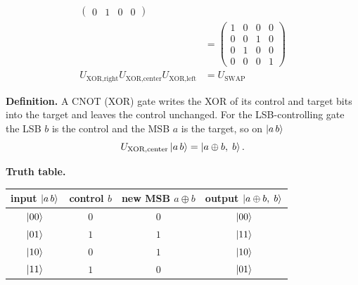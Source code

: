 \documentclass[a4paper, 10pt]{article}
\begin{document}
\begin{problem}
\begin{align*}
\begin{pmatrix}
		                   0 & 1 & 0 & 0
	                   \end{pmatrix}               \\
	 & = \begin{pmatrix}
		     1 & 0 & 0 & 0 \\
		     0 & 0 & 1 & 0 \\
		     0 & 1 & 0 & 0 \\
		     0 & 0 & 0 & 1
	     \end{pmatrix}                             \\
	U_{\text{XOR}, \text{right}} U_{\text{XOR}, \text{center}} U_{\text{XOR}, \text{left}}
	 & = U_{\text{SWAP}}
\end{align*}
\end{problem}

\begin{solution}
	\noindent \textbf{Definition.} A CNOT (XOR) gate writes the XOR of its control and target bits into the target and leaves the control unchanged.
	For the LSB-controlling gate the LSB \( b \) is the control and the MSB \( a \) is the target, so on \( \ket{a\,b} \)
	\[
		U_{\text{XOR},\text{center}}\ket{a\,b} = \ket{a \oplus b,\; b}.
	\]

	\noindent \textbf{Truth table.}
	\begin{center}
		\begin{tabular}{cccc}
			\toprule
			input \( \ket{a\,b} \) & control \( b \) & new MSB \( a \oplus b \) & output \( \ket{a \oplus b,\; b} \) \\
			\midrule
			\( \ket{00} \)         & \( 0 \)         & \( 0 \)                  & \( \ket{00} \)                     \\
			\( \ket{01} \)         & \( 1 \)         & \( 1 \)                  & \( \ket{11} \)                     \\
			\( \ket{10} \)         & \( 0 \)         & \( 1 \)                  & \( \ket{10} \)                     \\
			\( \ket{11} \)         & \( 1 \)         & \( 0 \)                  & \( \ket{01} \)                     \\
			\bottomrule
		\end{tabular}
	\end{center}


\end{solution}
\end{document}

